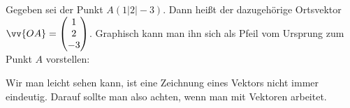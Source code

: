 \documentclass[ngerman, 12pt]{nssheetxea}
\begin{document}
\begin{example}
Gegeben sei der Punkt $A(1|2|-3)$. Dann heißt der dazugehörige Ortsvektor $\vv{OA}=\begin{pmatrix} 1 \\ 2 \\ -3 \end{pmatrix}$. Graphisch kann man ihn sich als Pfeil vom Ursprung zum Punkt $A$ vorstellen:
\begin{center}
\end{center}
Wir man leicht sehen kann, ist eine Zeichnung eines Vektors nicht immer eindeutig. Darauf sollte man also achten, wenn man mit Vektoren arbeitet.
\end{example}
\end{document}
